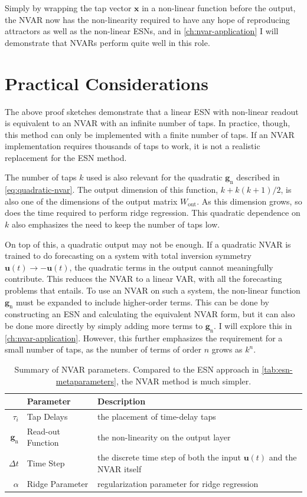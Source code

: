 Simply by wrapping the tap vector $\bm{x}$ in a non-linear function
before the output, the NVAR now has the non-linearity required to have
any hope of reproducing attractors as well as the non-linear ESNs, and
in \cref{ch:nvar-application} I will demonstrate that NVARs perform
quite well in this role.

\section{Practical Considerations}

The above proof sketches demonstrate that a linear ESN with non-linear
readout is equivalent to an NVAR with an infinite number of taps. In
practice, though, this method can only be implemented with a finite
number of taps. If an NVAR implementation requires thousands of taps
to work, it is not a realistic replacement for the ESN method.

The number of taps $k$ used is also relevant for the quadratic
$\bm{g}_\text{n}$ described in \cref{eq:quadratic-nvar}. The output
dimension of this function, $k + k(k + 1)/2$, is also one of the
dimensions of the output matrix $W_\text{out}$. As this dimension
grows, so does the time required to perform ridge regression. This
quadratic dependence on $k$ also emphasizes the need to keep the
number of taps low.

On top of this, a quadratic output may not be enough. If a quadratic
NVAR is trained to do forecasting on a system with total inversion
symmetry $\bm{u}(t) \rightarrow -\bm{u}(t)$, the quadratic terms in
the output cannot meaningfully contribute. This reduces the NVAR to a
linear VAR, with all the forecasting problems that entails. To use an
NVAR on such a system, the non-linear function $\bm{g}_\text{n}$ must
be expanded to include higher-order terms. This can be done by
constructing an ESN and calculating the equivalent NVAR form, but it
can also be done more directly by simply adding more terms to
$\bm{g}_\text{n}$. I will explore this in
\cref{ch:nvar-application}. However, this further emphasizes the
requirement for a small number of taps, as the number of terms of
order $n$ grows as $k^n$.

\begin{table}
  \caption{Summary of NVAR parameters. Compared to the ESN approach in
    \cref{tab:esn-metaparameters}, the NVAR method is much simpler.}
  \begin{tabularx}{\linewidth}{rlX}
    & Parameter & Description \\
    \hline
    \rule{0pt}{4ex}
    $\tau_i$ & Tap Delays & the placement of time-delay taps \\
    \rule{0pt}{4ex}
    $\bm{g}_\text{n}$ & Read-out Function & the non-linearity on the output layer \\
    \rule{0pt}{4ex}
    $\Delta t$ & Time Step & the discrete time step of both the input $\bm{u}(t)$ and the NVAR itself \\
    \rule{0pt}{4ex}
    $\alpha$ & Ridge Parameter & regularization parameter for ridge regression \\
  \end{tabularx}
  \label{tab:nvar-parameters}
\end{table}

